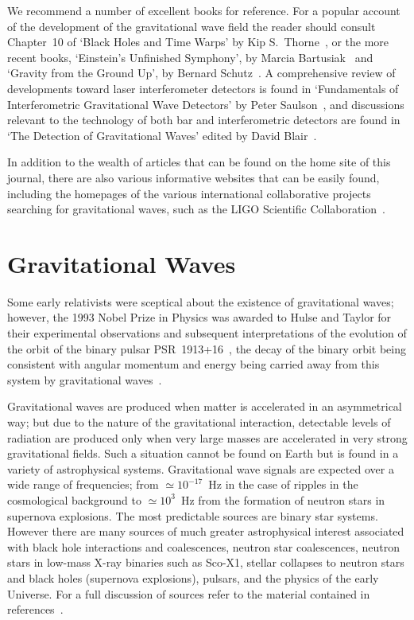 \documentclass{article}
\begin{document}
We recommend a number of excellent books for reference. For a popular account of
the development of the gravitational wave field the reader should consult
Chapter~10 of `Black Holes and Time Warps' by Kip S.\ Thorne~\cite{Thorne}, or
the more recent books, `Einstein's Unfinished Symphony', by Marcia
Bartusiak~\cite{Bartusiak:2003} and `Gravity from the Ground Up', by Bernard
Schutz~\cite{Schutz:2003}. A comprehensive review of developments toward laser
interferometer detectors is found in `Fundamentals of Interferometric
Gravitational Wave Detectors' by Peter Saulson~\cite{Saulsonbook}, and
discussions relevant to the technology of both bar and interferometric detectors
are found in `The Detection of Gravitational Waves' edited by David
Blair~\cite{Blair}.

In addition to the wealth of articles that can be found on the home site of
this journal, there are also various informative websites that can be easily
found, including the homepages of the various international collaborative
projects searching for gravitational waves, such as the LIGO Scientific
Collaboration~\cite{LSCweb}.

\newpage


\section{Gravitational Waves}
\label{section:gravwaves}

Some early relativists were sceptical about the existence of gravitational
waves; however, the 1993 Nobel Prize in Physics was awarded to Hulse and Taylor
for their experimental observations and subsequent interpretations of the
evolution of the orbit of the binary pulsar PSR~1913+16~\cite{Hulse, Taylor},
the decay of the binary orbit being consistent with angular momentum and energy
being carried away from this system by gravitational waves~\cite{Will}.

Gravitational waves are produced when matter is accelerated in an asymmetrical
way; but due to the nature of the gravitational interaction, detectable levels
of radiation are produced only when very large masses are accelerated in very
strong gravitational fields. Such a situation cannot be found on Earth but is
found in a variety of astrophysical systems. Gravitational wave signals are
expected over a wide range of frequencies; from $\simeq 10^{-17}$~Hz in the case
of ripples in the cosmological background to $\simeq 10^3$~Hz from the formation
of neutron stars in supernova explosions. The most predictable sources are
binary star systems. However there are many sources of much greater
astrophysical interest associated with black hole interactions and coalescences,
neutron star coalescences, neutron stars in low-mass X-ray binaries such as
Sco-X1, stellar collapses to neutron stars and black holes (supernova
explosions), pulsars, and the physics of the early Universe. For a full
discussion of sources refer to the material contained in
references~\cite{Sathyaprakash:2009,LISAsymposium, sources, Amaldiproc}.
\end{document}
